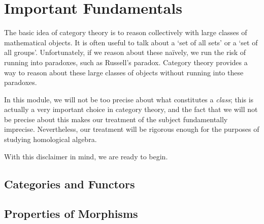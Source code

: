 \section{Important Fundamentals}

The basic idea of category theory is to reason collectively with large classes of mathematical objects. It is often useful to talk about a `set of all sets' or a `set of all groups'. Unfortunately, if we reason about these naïvely, we run the risk of running into paradoxes, such as Russell's paradox. Category theory provides a way to reason about these large classes of objects without running into these paradoxes.

In this module, we will not be too precise about what constitutes a \textit{class}; this is actually a very important choice in category theory, and the fact that we will not be precise about this makes our treatment of the subject fundamentally imprecise. Nevertheless, our treatment will be rigorous enough for the purposes of studying homological algebra.

With this disclaimer in mind, we are ready to begin.

\subsection{Categories and Functors}

\begin{boxdefinition}[Category]
    
\end{boxdefinition}

\subsection{Properties of Morphisms}